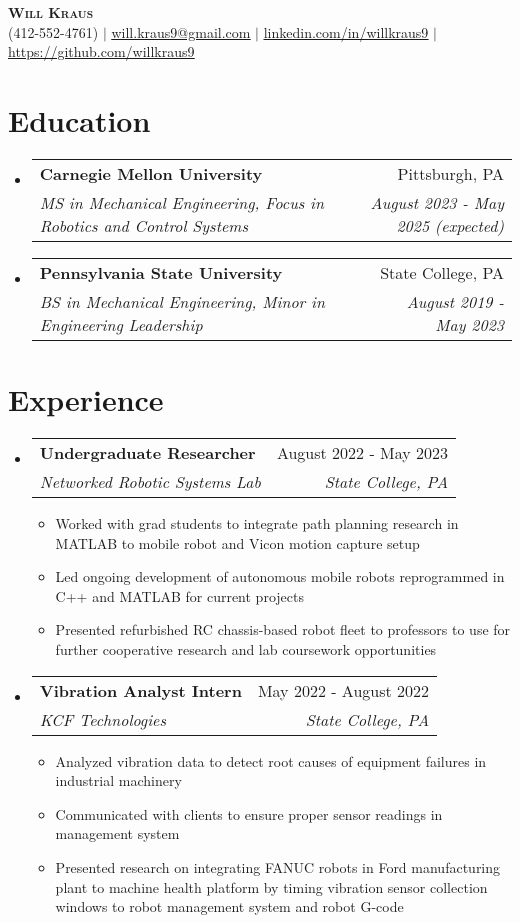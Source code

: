 \documentclass[letterpaper,11pt]{article}
\makeatletter
\newcommand{\resumeItem}[1]{
  \item\small{
    {#1 \vspace{-2pt}}
  }
}
\newcommand{\resumeSubheading}[4]{
  \vspace{-2pt}\item
    \begin{tabular*}{0.97\textwidth}[t]{l@{\extracolsep{\fill}}r}
      \textbf{#1} & #2 \\
      \textit{\small#3} & \textit{\small #4} \\
    \end{tabular*}\vspace{-7pt}
}
\newcommand{\resumeSubHeadingListStart}{\begin{itemize}[leftmargin=0.15in, label={}]}
\newcommand{\resumeSubHeadingListEnd}{\end{itemize}}
\newcommand{\resumeItemListStart}{\begin{itemize}}
\newcommand{\resumeItemListEnd}{\end{itemize}\vspace{-5pt}}
\makeatother
\begin{document}
\begin{center}
    \textbf{\scshape Will Kraus} \\ \vspace{1pt}
    \small (412-552-4761) $|$ \href{mailto:will.kraus9@gmail.com}{\underline{will.kraus9@gmail.com}} $|$ 
    \href{https://linkedin.com/in/willkraus9}{\underline{linkedin.com/in/willkraus9}} $|$
    \href{https://github.com/willkraus9}{\underline{https://github.com/willkraus9}}
\end{center}

\section{Education}
  \resumeSubHeadingListStart
  
    \resumeSubheading
      {Carnegie Mellon University}{Pittsburgh, PA}
      {MS in Mechanical Engineering, Focus in Robotics and Control Systems}{August 2023 -  May 2025 (expected)}
    \resumeSubheading
      {Pennsylvania State University}{State College, PA}
      {BS in Mechanical Engineering, Minor in Engineering Leadership}{August 2019 - May 2023}
  \resumeSubHeadingListEnd

\section{Experience}
  \resumeSubHeadingListStart

    \resumeSubheading
      {Undergraduate Researcher}{August 2022 - May 2023}
      {Networked Robotic Systems Lab}{State College, PA}
      \resumeItemListStart
        \resumeItem{Worked with grad students to integrate path planning research in MATLAB to mobile robot and Vicon motion capture setup}
        \resumeItem{Led ongoing development of autonomous mobile robots reprogrammed in C++ and MATLAB for current projects}
        \resumeItem{Presented refurbished RC chassis-based robot fleet to professors to use for further cooperative research and lab coursework opportunities}
      \resumeItemListEnd
      
    \resumeSubheading
      {Vibration Analyst Intern}{May 2022 - August 2022}
      {KCF Technologies}{State College, PA}
      \resumeItemListStart
        \resumeItem{Analyzed vibration data to detect root causes of equipment failures in industrial machinery}
        \resumeItem{Communicated with clients to ensure proper sensor readings in management system}
        \resumeItem{Presented research on integrating FANUC robots in Ford manufacturing plant to machine health platform by timing vibration sensor collection windows to robot management system and robot G-code}
    \resumeItemListEnd
  \resumeSubHeadingListEnd
\end{document}
